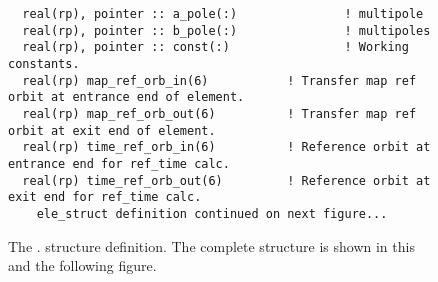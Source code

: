 \begin{figure}[tb]
\begin{verbatim}
  real(rp), pointer :: a_pole(:)               ! multipole
  real(rp), pointer :: b_pole(:)               ! multipoles
  real(rp), pointer :: const(:)                ! Working constants.
  real(rp) map_ref_orb_in(6)           ! Transfer map ref orbit at entrance end of element.
  real(rp) map_ref_orb_out(6)          ! Transfer map ref orbit at exit end of element.
  real(rp) time_ref_orb_in(6)          ! Reference orbit at entrance end for ref_time calc.
  real(rp) time_ref_orb_out(6)         ! Reference orbit at exit end for ref_time calc.
    ele_struct definition continued on next figure...
\end{verbatim}
\caption[The  (part 1).]{The . structure definition. 
The complete structure is shown in this and the following figure.}
\label{f:ele.struct1}
\end{figure}


